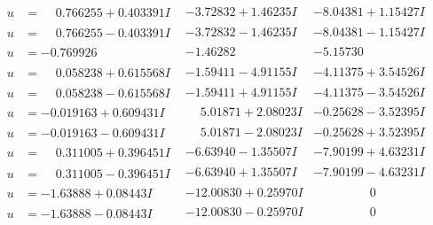 \documentclass[1p]{elsarticle_modified}
\theoremstyle{definition}
\begin{document}
$$\begin{array}{c|c|c}
\begin{aligned}
u &= \phantom{-}0.766255 + 0.403391 I\end{aligned}
 & -3.72832 + 1.46235 I & -8.04381 + 1.15427 I \\ \hline\begin{aligned}
u &= \phantom{-}0.766255 - 0.403391 I\end{aligned}
 & -3.72832 - 1.46235 I & -8.04381 - 1.15427 I \\ \hline\begin{aligned}
u &= -0.769926\phantom{ +0.000000I}\end{aligned}
 & -1.46282\phantom{ +0.000000I} & -5.15730\phantom{ +0.000000I} \\ \hline\begin{aligned}
u &= \phantom{-}0.058238 + 0.615568 I\end{aligned}
 & -1.59411 - 4.91155 I & -4.11375 + 3.54526 I \\ \hline\begin{aligned}
u &= \phantom{-}0.058238 - 0.615568 I\end{aligned}
 & -1.59411 + 4.91155 I & -4.11375 - 3.54526 I \\ \hline\begin{aligned}
u &= -0.019163 + 0.609431 I\end{aligned}
 & \phantom{-}5.01871 + 2.08023 I & -0.25628 - 3.52395 I \\ \hline\begin{aligned}
u &= -0.019163 - 0.609431 I\end{aligned}
 & \phantom{-}5.01871 - 2.08023 I & -0.25628 + 3.52395 I \\ \hline\begin{aligned}
u &= \phantom{-}0.311005 + 0.396451 I\end{aligned}
 & -6.63940 - 1.35507 I & -7.90199 + 4.63231 I \\ \hline\begin{aligned}
u &= \phantom{-}0.311005 - 0.396451 I\end{aligned}
 & -6.63940 + 1.35507 I & -7.90199 - 4.63231 I \\ \hline\begin{aligned}
u &= -1.63888 + 0.08443 I\end{aligned}
 & -12.00830 + 0.25970 I & \phantom{-0.000000 } 0 \\ \hline\begin{aligned}
u &= -1.63888 - 0.08443 I\end{aligned}
 & -12.00830 - 0.25970 I & \phantom{-0.000000 } 0 \\ \hline\begin{aligned}

\end{aligned}
\end{array}$$
\end{document}
